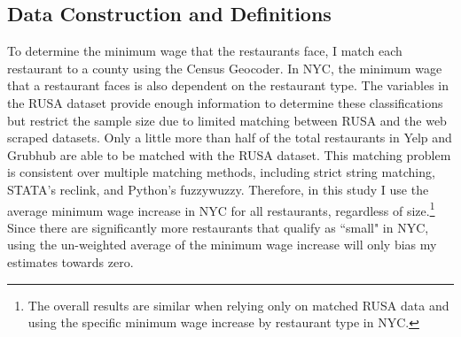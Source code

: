 \documentclass[11pt]{article}
\begin{document}
\subsection{Data Construction and Definitions}

To determine the minimum wage that the restaurants face, I match each restaurant to a county using the Census Geocoder. In NYC, the minimum wage that a restaurant faces is also dependent on the restaurant type. The variables in the RUSA dataset provide enough information to determine these classifications but restrict the sample size due to limited matching between RUSA and the web scraped datasets. Only a little more than half of the total restaurants in Yelp and Grubhub are able to be matched with the RUSA dataset. This matching problem is consistent over multiple matching methods, including strict string matching, STATA's reclink, and Python's fuzzywuzzy. Therefore, in this study I use the average minimum wage increase in NYC for all restaurants, regardless of size.\footnote{The overall results are similar when relying only on matched RUSA data and using the specific minimum wage increase by restaurant type in NYC.} Since there are significantly more restaurants that qualify as ``small" in NYC, using the un-weighted average of the minimum wage increase will only bias my estimates towards zero. 
\end{document}
